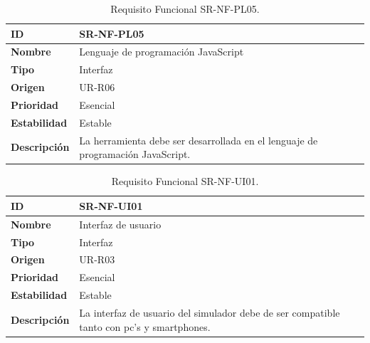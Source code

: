 \begin{center}
\begin{table}[htbp]
\centering
\begin{tabular}{@{}p{2.5cm} p{9cm}@{}} 
\toprule
\textbf{ID} 				& SR-NF-PL05 \\
\midrule
\textbf{Nombre} 			& Lenguaje de programación JavaScript \\
\midrule
\textbf{Tipo} 			& Interfaz \\
\midrule
\textbf{Origen} 			& UR-R06 \\
\midrule
\textbf{Prioridad}		& Esencial \\
\midrule
\textbf{Estabilidad} 		& Estable \\
\midrule
\textbf{Descripción} 	& La herramienta debe ser desarrollada en el lenguaje de programación JavaScript. \\
\bottomrule
\end{tabular}
\caption{Requisito Funcional SR-NF-PL05.}
\label{tab:srnfpl05}
\end{table}
\end{center}

\begin{center}
\begin{table}[htbp]
\centering
\begin{tabular}{@{}p{2.5cm} p{9cm}@{}} 
\toprule
\textbf{ID} 				& SR-NF-UI01 \\
\midrule
\textbf{Nombre} 			& Interfaz de usuario \\
\midrule
\textbf{Tipo} 			& Interfaz \\
\midrule
\textbf{Origen} 			& UR-R03 \\
\midrule
\textbf{Prioridad}		& Esencial \\
\midrule
\textbf{Estabilidad} 		& Estable \\
\midrule
\textbf{Descripción} 	& La interfaz de usuario del simulador debe de ser compatible tanto con pc's y smartphones. \\
\bottomrule
\end{tabular}
\caption{Requisito Funcional SR-NF-UI01.}
\label{tab:srnfui01}
\end{table}
\end{center}

